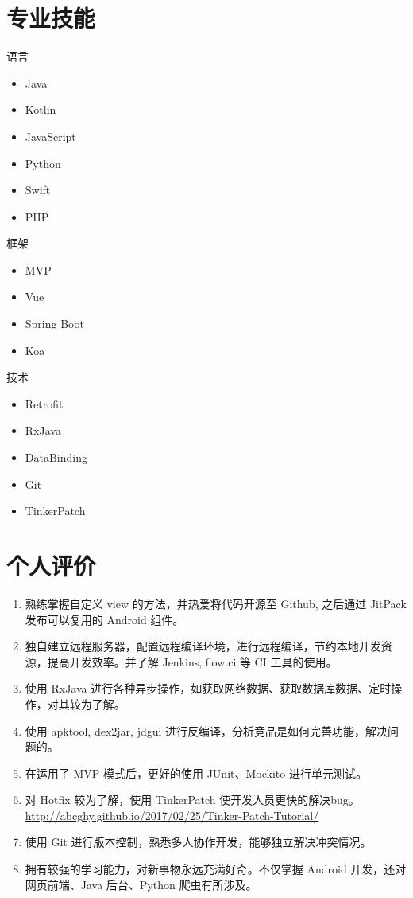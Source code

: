 \documentclass[11pt]{res}
\begin{document}
\begin{resume}
\section{专业技能}
  \begin{multicols}{3}
    语言
    \begin{itemize}
      \item Java
      \item Kotlin
      \item JavaScript
      \item Python
      \item Swift
      \item PHP
    \end{itemize}
    框架
    \begin{itemize}
      \item MVP
      \item Vue
      \item Spring Boot
      \item Koa
    \end{itemize}
    技术
    \begin{itemize}
      \item Retrofit
      \item RxJava
      \item DataBinding
      \item Git
      \item TinkerPatch
    \end{itemize}
  \end{multicols}

\section{个人评价}
  \begin{enumerate}
      \item 熟练掌握自定义 view 的方法，并热爱将代码开源至 Github, 之后通过 JitPack 发布可以复用的 Android 组件。
      \item 独自建立远程服务器，配置远程编译环境，进行远程编译，节约本地开发资源，提高开发效率。并了解 Jenkins, flow.ci 等 CI 工具的使用。
      \item 使用 RxJava 进行各种异步操作，如获取网络数据、获取数据库数据、定时操作，对其较为了解。
      \item 使用 apktool, dex2jar, jdgui 进行反编译，分析竞品是如何完善功能，解决问题的。
      \item 在运用了 MVP 模式后，更好的使用 JUnit、Mockito 进行单元测试。
      \item 对 Hotfix 较为了解，使用 TinkerPatch 使开发人员更快的解决bug。\\ \url{http://abcghy.github.io/2017/02/25/Tinker-Patch-Tutorial/}
      \item 使用 Git 进行版本控制，熟悉多人协作开发，能够独立解决冲突情况。
      \item 拥有较强的学习能力，对新事物永远充满好奇。不仅掌握 Android 开发，还对网页前端、Java 后台、Python 爬虫有所涉及。
  \end{enumerate}

\end{resume}
\end{document}
